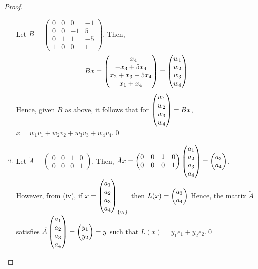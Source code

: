 \begin{proof}
\begin{enumerate}[(i)]
        Let $B=\begin{pmatrix}
            0 & 0 & 0 & -1\\
            0 & 0 & -1 & 5\\
            0 & 1 & 1 & -5\\
            1 & 0 & 0 & 1
        \end{pmatrix}$.
        Then, 
        \[
            \begin{aligned}
                Bx=\begin{pmatrix} -x_4\\ -x_3+5x_4\\x_2+x_3-5x_4 \\ x_1+x_4\end{pmatrix}=\begin{pmatrix} w_1\\ w_2\\w_3 \\ w_4\end{pmatrix}
            \end{aligned}
        \]
        Hence, given $B$ as above, it follows that for $\begin{pmatrix} w_1\\ w_2\\w_3 \\ w_4\end{pmatrix}=Bx$, $x=w_1v_1+w_2v_2+w_3v_3+w_4v_4$.\qed
        \item Let $\tilde{A}=\begin{pmatrix}
            0 & 0 & 1 & 0\\
            0 & 0 & 0 & 1
        \end{pmatrix}$.
        Then, $\tilde{A}x=\begin{pmatrix}
            0 & 0 & 1 & 0\\
            0 & 0 & 0 & 1
        \end{pmatrix}\begin{pmatrix} a_1\\ a_2\\a_3 \\ a_4\end{pmatrix}=\begin{pmatrix} a_3\\ a_4\end{pmatrix}$.
        However, from (iv), if $x=\begin{pmatrix} a_1\\ a_2\\a_3 \\ a_4\end{pmatrix}_{\{v_i\}}$ then $L(x)=\begin{pmatrix} a_3\\ a_4\end{pmatrix}$
        Hence, the matrix $\tilde{A}$ satisfies $\tilde{A}\begin{pmatrix} a_1\\ a_2\\a_3 \\ a_4\end{pmatrix}=\begin{pmatrix} y_1\\ y_2\end{pmatrix}=y$ such that $L(x)=y_1e_1+y_2e_2$.\qed
    \end{enumerate}
    \renewcommand{\qedsymbol}{}
\end{proof}
